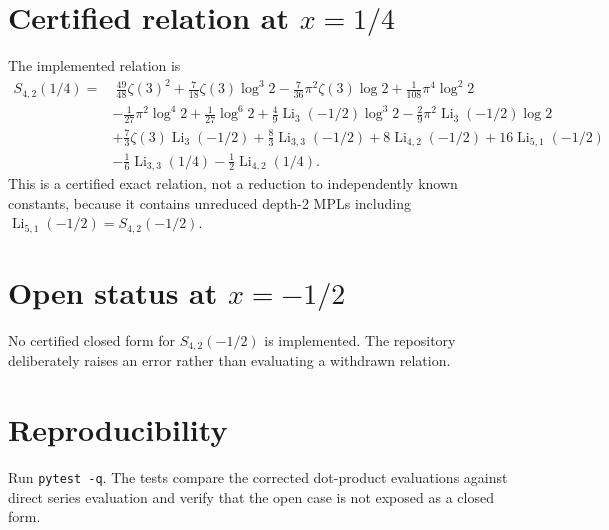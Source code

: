 \documentclass[11pt]{article}
\begin{document}
\section{Certified relation at $x=1/4$}
The implemented relation is
\begin{align*}
S_{4,2}(1/4)=&\ \frac{49}{48}\zeta(3)^2+\frac{7}{18}\zeta(3)\log^3 2-\frac{7}{36}\pi^2\zeta(3)\log2+\frac{1}{108}\pi^4\log^2 2 \\
&-\frac{1}{27}\pi^2\log^4 2+\frac{1}{27}\log^6 2+\frac49\operatorname{Li}_3(-1/2)\log^3 2-\frac29\pi^2\operatorname{Li}_3(-1/2)\log2 \\
&+\frac73\zeta(3)\operatorname{Li}_3(-1/2)+\frac83\operatorname{Li}_{3,3}(-1/2)+8\operatorname{Li}_{4,2}(-1/2)+16\operatorname{Li}_{5,1}(-1/2) \\
&-\frac16\operatorname{Li}_{3,3}(1/4)-\frac12\operatorname{Li}_{4,2}(1/4).
\end{align*}
This is a certified exact relation, not a reduction to independently known constants, because it contains unreduced depth-2 MPLs including $\operatorname{Li}_{5,1}(-1/2)=S_{4,2}(-1/2)$.

\section{Open status at $x=-1/2$}
No certified closed form for $S_{4,2}(-1/2)$ is implemented. The repository deliberately raises an error rather than evaluating a withdrawn relation.

\section{Reproducibility}
Run \texttt{pytest -q}. The tests compare the corrected dot-product evaluations against direct series evaluation and verify that the open case is not exposed as a closed form.
\end{document}
